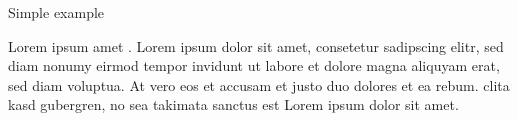 \documentclass{article}
\begin{document}
{Simple example}


Lorem ipsum  amet . Lorem ipsum dolor sit
amet, consetetur sadipscing elitr, sed diam nonumy eirmod tempor
invidunt ut labore et dolore magna aliquyam erat, sed diam voluptua. At
vero eos et accusam et justo duo dolores et ea rebum.  clita
kasd gubergren, no sea takimata sanctus est Lorem ipsum dolor sit amet.
\end{document}
